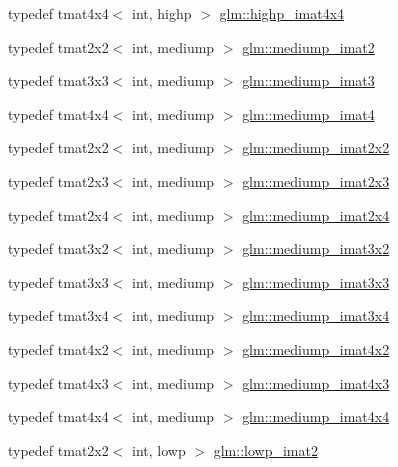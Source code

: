 \begin{DoxyCompactItemize}
\item 
typedef tmat4x4$<$ int, highp $>$ \hyperlink{group__gtc__matrix__integer_ga2a80b8ab686297145ecf713699233114}{glm\-::highp\-\_\-imat4x4}
\item 
typedef tmat2x2$<$ int, mediump $>$ \hyperlink{group__gtc__matrix__integer_gae812330b83568359273b6ec96b002863}{glm\-::mediump\-\_\-imat2}
\item 
typedef tmat3x3$<$ int, mediump $>$ \hyperlink{group__gtc__matrix__integer_gab033bd6a2bfebb1aa35d458c6f077ccb}{glm\-::mediump\-\_\-imat3}
\item 
typedef tmat4x4$<$ int, mediump $>$ \hyperlink{group__gtc__matrix__integer_ga680c97868de08658ca4924718d951def}{glm\-::mediump\-\_\-imat4}
\item 
typedef tmat2x2$<$ int, mediump $>$ \hyperlink{group__gtc__matrix__integer_ga52a40f2f95562746fd8084726a300963}{glm\-::mediump\-\_\-imat2x2}
\item 
typedef tmat2x3$<$ int, mediump $>$ \hyperlink{group__gtc__matrix__integer_ga07314e9f05b82367570ca44c3ef7c0a7}{glm\-::mediump\-\_\-imat2x3}
\item 
typedef tmat2x4$<$ int, mediump $>$ \hyperlink{group__gtc__matrix__integer_ga944a139f15de6bc12e9c7bf615ffc4f5}{glm\-::mediump\-\_\-imat2x4}
\item 
typedef tmat3x2$<$ int, mediump $>$ \hyperlink{group__gtc__matrix__integer_ga8f682b5b64e2072c0729409ee6bfe2af}{glm\-::mediump\-\_\-imat3x2}
\item 
typedef tmat3x3$<$ int, mediump $>$ \hyperlink{group__gtc__matrix__integer_gab4c647321a342c58119144ad08c6c406}{glm\-::mediump\-\_\-imat3x3}
\item 
typedef tmat3x4$<$ int, mediump $>$ \hyperlink{group__gtc__matrix__integer_ga721a754fc35cc5ac097e331d893a6b2c}{glm\-::mediump\-\_\-imat3x4}
\item 
typedef tmat4x2$<$ int, mediump $>$ \hyperlink{group__gtc__matrix__integer_gabfe107153637dfd7a0c272ff1ba892ed}{glm\-::mediump\-\_\-imat4x2}
\item 
typedef tmat4x3$<$ int, mediump $>$ \hyperlink{group__gtc__matrix__integer_ga0da8b13e141337d016a6541ea2c0362c}{glm\-::mediump\-\_\-imat4x3}
\item 
typedef tmat4x4$<$ int, mediump $>$ \hyperlink{group__gtc__matrix__integer_gae226af929e72730be59a58d89a4be028}{glm\-::mediump\-\_\-imat4x4}
\item 
typedef tmat2x2$<$ int, lowp $>$ \hyperlink{group__gtc__matrix__integer_ga4840a4d8b9e8997f1173da9e8e5e4de4}{glm\-::lowp\-\_\-imat2}

\end{DoxyCompactItemize}
